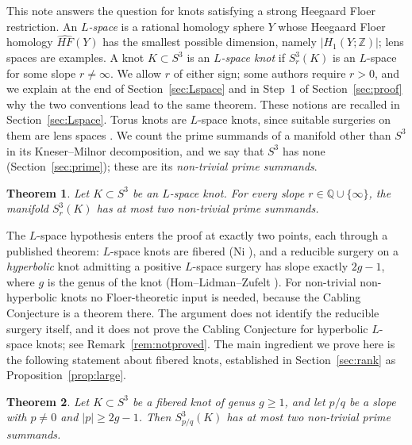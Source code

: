 \documentclass[11pt]{article}
\newcommand{\Z}{\mathbb Z}
\newcommand{\Q}{\mathbb Q}
\newcommand{\Surg}[2]{S^3_{#1}(#2)}
\newcommand{\HFhat}{\widehat{HF}}
\newtheorem{theorem}{Theorem}[section]
\theoremstyle{definition}
\theoremstyle{remark}
\begin{document}
This note answers the question for knots satisfying a strong
Heegaard Floer restriction. An \emph{\(L\)-space} is a rational homology
sphere \(Y\) whose Heegaard Floer homology \(\HFhat(Y)\) has the smallest
possible dimension, namely \(|H_1(Y;\Z)|\); lens spaces are examples. A knot
\(K\subset S^3\) is an \emph{\(L\)-space knot} if \(\Surg{r}{K}\) is an
\(L\)-space for some slope \(r\neq\infty\). We allow \(r\) of either sign;
some authors require \(r>0\), and we explain at the end of
Section~\ref{sec:Lspace} and in Step~1 of Section~\ref{sec:proof} why the
two conventions lead to the same theorem. These notions are recalled in
Section~\ref{sec:Lspace}. Torus knots are \(L\)-space knots, since
suitable surgeries on them are lens spaces \cite{Moser1971}.
We count the prime summands of a manifold other than \(S^3\) in its
Kneser--Milnor decomposition, and we say that \(S^3\) has none
(Section~\ref{sec:prime}); these are its \emph{non-trivial prime
summands}.

\begin{theorem}\label{thm:main}
Let \(K\subset S^3\) be an \(L\)-space knot. For every slope
\(r\in\Q\cup\{\infty\}\), the manifold \(\Surg{r}{K}\) has at most two
non-trivial prime summands.
\end{theorem}

The \(L\)-space hypothesis enters the proof at exactly two points, each
through a published theorem: \(L\)-space knots are fibered (Ni
\cite{Ni2007}), and a reducible surgery on a \emph{hyperbolic} knot
admitting a positive \(L\)-space surgery has slope exactly \(2g-1\), where
\(g\) is the genus of the knot (Hom--Lidman--Zufelt \cite[Theorem~1.3]{HLZ2015}). For non-trivial non-hyperbolic knots no Floer-theoretic input is needed,
because the Cabling Conjecture is a theorem there. The argument does not identify
the reducible surgery itself, and it does not prove the Cabling
Conjecture for hyperbolic \(L\)-space knots; see Remark~\ref{rem:notproved}.
The main ingredient we prove here is the following statement about
fibered knots, established in Section~\ref{sec:rank} as
Proposition~\ref{prop:large}.

\begin{theorem}\label{thm:fibered}
Let \(K\subset S^3\) be a fibered knot of genus \(g\geq1\), and let
\(p/q\) be a slope with \(p\neq0\) and \(|p|\geq 2g-1\). Then
\(\Surg{p/q}{K}\) has at most two non-trivial prime summands.
\end{theorem}
\end{document}
